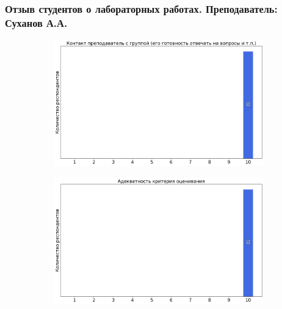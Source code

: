     \subsubsection{Отзыв студентов о лабораторных работах. Преподаватель: Суханов А.А.}
        \begin{figure}[H]
            \centering
            \begin{subfigure}[b]{0.45\textwidth}
                \centering
                \includegraphics[width=\textwidth]{images/2 course/Радиотехнические цепи и сигналы/labniks-marks-Суханов А.А.-0.png}
            \end{subfigure}
            \begin{subfigure}[b]{0.45\textwidth}
                \centering
                \includegraphics[width=\textwidth]{images/2 course/Радиотехнические цепи и сигналы/labniks-marks-Суханов А.А.-1.png}
            \end{subfigure}
            \begin{subfigure}[b]{0.45\textwidth}
                \centering

\end{subfigure}
\end{figure}
